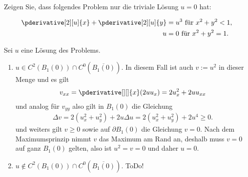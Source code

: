 
\begin{exercise}

Zeigen Sie, dass folgendes Problem nur die triviale Lösung $u = 0$ hat:

\begin{align*}
    \pderivative[2][u]{x} + \pderivative[2][u]{y} & = u^3 ~\text{für}~ x^2 + y^2 < 1, \\
    \quad
    u & = 0 ~\text{für}~ x^2 + y^2 = 1.
\end{align*}

\end{exercise}


\begin{solution}
	Sei $u$ eine Lösung des Problems.
	\begin{enumerate}[label = Fall \arabic*:]
		\item $u \in C^2(B_1(0)) \cap C^0(\overline{B_1(0)})$. In diesem Fall ist auch $v := u^2$ in dieser Menge und es gilt 
		\begin{align*}
		v_{xx} = \pderivative[][]{x}(2 u u_x) = 2 u_x^2 + 2 u u_{xx}
		\end{align*}
		und analog für $v_{yy}$ also gilt in $B_1(0)$ die Gleichung
		\begin{align*}
		\Delta v = 2 (u_x^2 + u_y^2) + 2 u \Delta u = 2(u_x^2 + u_y^2) + 2 u^4 \geq 0.
		\end{align*}
		und weiters gilt $v \geq 0$ sowie auf $\partial B_1(0)$ die Gleichung $v = 0$. Nach dem Maximumsprinzip nimmt $v$ das Maximum am Rand an, deshalb muss $v = 0$ auf ganz $B_1(0)$ gelten, also ist $u^2 = v = 0$ und daher $u = 0$.
		
		\item $u \notin C^2(B_1(0)) \cap C^0(\overline{B_1(0)})$. ToDo!
	\end{enumerate}

\end{solution}

